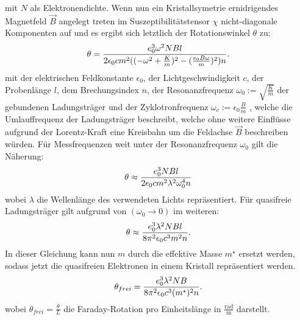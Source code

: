 mit $N$ als Elektronendichte. Wenn nun ein Kristallsymetrie ernidrigendes Magnetfeld $\vec{B}$ angelegt treten im Suszeptibilitätstensor
$\chi$ nicht-diagonale Komponenten auf und es ergibt sich letztlich der Rotationswinkel $\theta$ zu:
\begin{equation*}
  \theta = \frac{e_0^3 \omega^2 NBl}{2\epsilon_0 cm^2((-\omega^2+\frac{K}{m})^2-(\frac{e_0B\omega}{m})^2)n}.\\
\end{equation*}
mit der elektrischen Feldkonstante $\epsilon_0$, der Lichtgeschwindigkeit $c$, der Probenlänge $l$, dem
Brechungsindex $n$, der Resonanzfrequenz $\omega_0:= \sqrt{\frac{K}{m}}$ der gebundenen Ladungsträger
und der Zyklotronfrequenz $\omega_c:=\epsilon_0\frac{B}{m}$ , welche die Umlauffrequenz der Ladungsträger
beschreibt, welche ohne weitere Einflüsse aufgrund der Lorentz-Kraft eine Kreisbahn um
die Feldachse $\vec{B}$ beschreiben würden. Für Messfrequenzen weit unter der Resonanzfrequenz
$\omega_0$ gilt die Näherung:
\begin{equation}
\label{eq:nichtfrei}
  \theta \approx \frac{e_0^3 NBl}{2\epsilon_0cm^2\lambda^2\omega_0^4n}\\
\end{equation}
wobei $\lambda$ die Wellenlänge des verwendeten Lichts repräsentiert. Für quasifreie Ladungsträger gilt aufgrund von $(\omega_0\rightarrow 0)$ im weiteren:
\begin{equation*}
  \theta \approx \frac{e_0^3\lambda^2NBl}{8\pi^2\epsilon_0c^3m^2n}.\\
\end{equation*}
In dieser Gleichung kann nun $m$ durch die effektive Masse $m^{\star}$ ersetzt werden, sodass jetzt  die quasifreien Elektronen in einem Kristall repräsentiert werden.
\begin{equation}
  \label{eq:thetafrei}
  \theta_{frei}=\frac{e_0^3\lambda^2NB}{8\pi^2\epsilon_0c^3(m^{\star})^2n}.\\
\end{equation}
wobei $\theta_{frei}=\frac{\theta}{L}$ die Faraday-Rotation pro Einheitslänge in $\frac{\mathrm{rad}}{\mathrm{m}}$ darstellt.